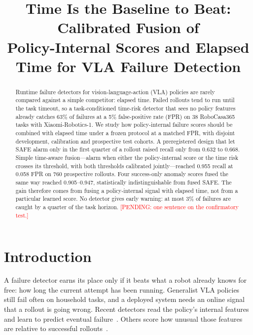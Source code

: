 \documentclass[conference,a4paper]{IEEEtran}
\newcommand{\pending}[1]{\textcolor{red}{[PENDING: #1]}}
\newcommand{\todo}[1]{\textcolor{orange}{[TODO: #1]}}
\begin{document}
\title{Time Is the Baseline to Beat: Calibrated Fusion of\\
Policy-Internal Scores and Elapsed Time for VLA Failure Detection}

\author{
\IEEEauthorblockA{Shinoda Lab \todo{affiliation and co-authors}}}

\maketitle
\thispagestyle{plain}
\pagestyle{plain}

\begin{abstract}
Runtime failure detectors for vision-language-action (VLA) policies are rarely compared
against a simple competitor: elapsed time. Failed rollouts tend to run until the task
timeout, so a task-conditioned time-risk detector that sees no policy features already
catches 63\% of failures at a 5\% false-positive rate (FPR) on 38 RoboCasa365 tasks with
Xiaomi-Robotics-1. We study how policy-internal failure scores should be combined with
elapsed time under a frozen protocol at a matched FPR, with disjoint development,
calibration and prospective test cohorts. A preregistered design that let SAFE alarm only
in the first quarter of a rollout raised recall only from 0.632 to 0.668. Simple
time-aware fusion---alarm when either the policy-internal score or the time risk crosses
its threshold, with both thresholds calibrated jointly---reached 0.955 recall at 0.058 FPR
on 760 prospective rollouts. Four success-only anomaly scores fused the same way reached
0.905--0.947, statistically indistinguishable from fused SAFE. The gain therefore comes
from fusing a policy-internal signal with elapsed time, not from a particular learned
score. No detector gives early warning: at most 3\% of failures are caught by a quarter of
the task horizon. \pending{one sentence on the confirmatory test.}
\end{abstract}

\section{Introduction}

A failure detector earns its place only if it beats what a robot already knows for free:
how long the current attempt has been running. Generalist VLA policies still fail often on
household tasks, and a deployed system needs an online signal that a rollout is going
wrong. Recent detectors read the policy's internal features and learn to predict eventual
failure~\cite{gu2025safe}. Others score how unusual those features are relative to
successful rollouts~\cite{xu2025faildetect,lee2018mahalanobis,sun2022knn}.
\end{document}
